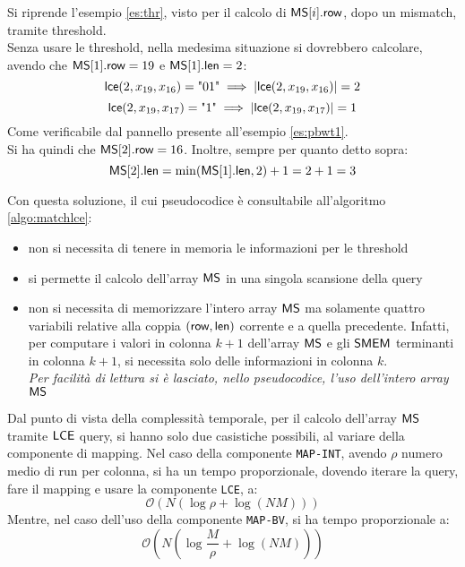 \begin{esempio}
  Si riprende l'esempio \ref{es:thr}, visto per il calcolo di $\mbox{\rm {\sf MS}}[i].\mbox{\rm {\sf row}}$,
  dopo un mismatch, tramite threshold. \\
  Senza usare le threshold, nella medesima situazione si dovrebbero
  calcolare, avendo che $\mbox{\rm {\sf MS}}[1].\mbox{\rm {\sf row}}=19$ e $\mbox{\rm {\sf MS}}[1].\mbox{\rm {\sf len}} =2$:
  \[\mbox{\rm {\sf lce}}(2, x_{19}, x_{16}) = \mbox{"01"} \implies|\mbox{\rm {\sf lce}}(2, x_{19}, x_{16})|=2\]
  \[\mbox{\rm {\sf lce}}(2, x_{19}, x_{17}) = \mbox{"1"} \implies|\mbox{\rm {\sf lce}}(2, x_{19}, x_{17})|=1\]
  Come verificabile dal pannello presente all'esempio \ref{es:pbwt1}.\\
  Si ha quindi che $\mbox{\rm {\sf MS}}[2].\mbox{\rm {\sf row}}=16$. Inoltre, sempre per quanto detto sopra:
  \[\mbox{\rm {\sf MS}}[2].\mbox{\rm {\sf len}}=\min(\mbox{\rm {\sf MS}}[1].\mbox{\rm {\sf len}}, 2)+1=2+1=3\]
\end{esempio}
\noindent
Con questa soluzione, il cui pseudocodice è consultabile all'algoritmo
\ref{algo:matchlce}: 
\begin{itemize}
  \item non si necessita di tenere in memoria le informazioni per le
  threshold
  \item si permette il calcolo dell'array $\mbox{\rm {\sf MS}}$ in una singola scansione della
  query
  \item non si necessita di memorizzare l'intero array $\mbox{\rm {\sf MS}}$ ma solamente
  quattro variabili relative alla coppia
  $(\mbox{\rm {\sf row}},\mbox{\rm {\sf len}})$ corrente e a quella precedente. Infatti, per computare i valori
  in 
  colonna $k+1$ dell'array $\mbox{\rm {\sf MS}}$ e gli $\mbox{\rm {\sf SMEM}}$ terminanti in colonna $k+1$, si
  necessita solo delle informazioni in colonna $k$. \\
  \textit{Per facilità di
    lettura si è lasciato, nello pseudocodice, l'uso dell'intero array $\mbox{\rm {\sf MS}}$}
\end{itemize}
Dal punto di vista della complessità temporale, per il calcolo dell'array $\mbox{\rm {\sf MS}}$
tramite $\mbox{\rm {\sf LCE}}$ query,
si hanno solo due casistiche 
possibili, al variare della componente di mapping. 
Nel caso della componente \texttt{MAP-INT}, avendo $\rho$ numero medio di run
per colonna, si 
ha un tempo proporzionale, dovendo iterare la query, fare il mapping e usare la
componente \texttt{LCE}, a: 
\begin{equation}
  \label{eq:mslce22}
  \mathcal{O}(N(\log \rho+\log (NM)))
\end{equation}
Mentre, nel caso dell'uso della componente \texttt{MAP-BV}, si ha tempo
proporzionale a:
\begin{equation}
  \label{eq:mslce3}
  \mathcal{O}\left(N\left(\log \frac{M}{\rho}+\log (NM)\right)\right)
\end{equation}
